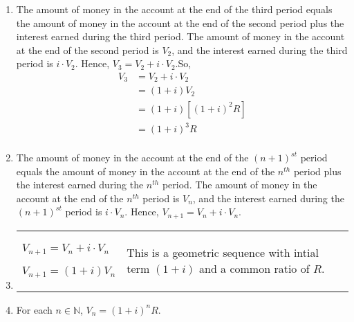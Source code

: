 \documentclass[11pt]{article}
\begin{document}
\begin{enumerate}
\item The amount of money in the account at the end of the third period equals the amount of money in the account at the end of the second period plus the interest earned during the third period.  The amount of money in the account at the end of the second period is  $V_2 $, and the interest earned during the third period is  $i \cdot V_2 $.  Hence,  $V_3  = V_2  + i \cdot V_2 $.So, 
\[
\begin{aligned}
V_3  &= V_2  + i \cdot V_2  \\ 
     &= \left( {1 + i} \right)V_2  \\ 
     &= \left( {1 + i} \right)\left[ {\left( {1 + i} \right)^2 R} \right] \\ 
     &= \left( {1 + i} \right)^3 R \\ 
\end{aligned}
\]
\item The amount of money in the account at the end of the $\left( {n + 1} \right)^{st} $
 period equals the amount of money in the account at the end of the $n^{th} $ period plus the interest earned during the $n^{th} $ period.  The amount of money in the account at the end of the $n^{th} $ period is  $V_n $, and the interest earned during the $\left( {n + 1} \right)^{st}$ period is  $i \cdot V_n $.  Hence,  $V_{n + 1}  = V_n  + i \cdot V_n $.

\item
\begin{tabular}[t]{p{2in} p{3in}}
 $V_{n + 1}  = V_n  + i \cdot V_n$
   
 $V_{n + 1}  = \left( {1 + i} \right)V_n$ 
&
This is a geometric sequence with intial term  $\left( {1 + i} \right)$ and a common ratio of  
$R$. \\
\end{tabular}

\item For each  $n \in \mathbb{N}$,  $V_n  = \left( {1 + i} \right)^n R$.


\end{enumerate}
\end{document}
